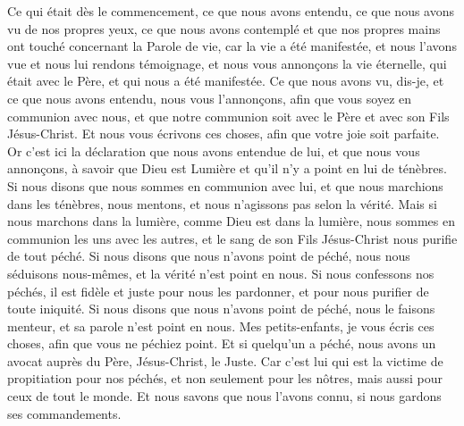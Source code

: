 \begin{multicols}{2}
\VerseOne{}Ce qui était dès le commencement, ce que nous avons entendu, ce que nous avons vu de nos propres yeux, ce que nous avons contemplé et que nos propres mains ont touché concernant la Parole de vie,
car la vie a été manifestée, et nous l'avons vue et nous lui rendons témoignage, et nous vous annonçons la vie éternelle, qui était avec le Père, et qui nous a été manifestée.
Ce que nous avons vu, dis-je, et ce que nous avons entendu, nous vous l'annonçons, afin que vous soyez en communion avec nous, et que notre communion soit avec le Père et avec son Fils Jésus-Christ.
Et nous vous écrivons ces choses, afin que votre joie soit parfaite.
Or c'est ici la déclaration que nous avons entendue de lui, et que nous vous annonçons, à savoir que Dieu est Lumière et qu'il n'y a point en lui de ténèbres.
Si nous disons que nous sommes en communion avec lui, et que nous marchions dans les ténèbres, nous mentons, et nous n'agissons pas selon la vérité.
Mais si nous marchons dans la lumière, comme Dieu est dans la lumière, nous sommes en communion les uns avec les autres, et le sang de son Fils Jésus-Christ nous purifie de tout péché.
Si nous disons que nous n'avons point de péché, nous nous séduisons nous-mêmes, et la vérité n'est point en nous.
Si nous confessons nos péchés, il est fidèle et juste pour nous les pardonner, et pour nous purifier de toute iniquité.
Si nous disons que nous n'avons point de péché, nous le faisons menteur, et sa parole n'est point en nous.
\VerseOne{}Mes petits-enfants, je vous écris ces choses, afin que vous ne péchiez point. Et si quelqu'un a péché, nous avons un avocat auprès du Père, Jésus-Christ, le Juste.
Car c'est lui qui est la victime de propitiation pour nos péchés, et non seulement pour les nôtres, mais aussi pour ceux de tout le monde.
Et nous savons que nous l'avons connu, si nous gardons ses commandements.

\end{multicols}

